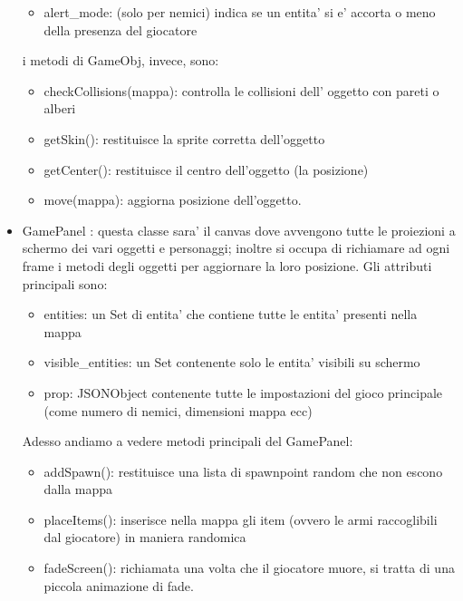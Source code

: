 \documentclass[12pt,a4paper]{report}
\begin{document}
\begin{itemize}
\begin{itemize}
\item alert\_mode: (solo per nemici) indica se un entita' si e' accorta o meno della presenza del giocatore
\end{itemize}
i metodi di GameObj, invece, sono:
\begin{itemize}
\item checkCollisions(mappa): controlla le collisioni dell' oggetto con pareti o alberi
\item getSkin(): restituisce la sprite corretta dell'oggetto
\item getCenter(): restituisce il centro dell'oggetto (la posizione)
\item move(mappa): aggiorna posizione dell'oggetto.
\end{itemize}

\item GamePanel : questa classe sara' il canvas dove avvengono tutte le proiezioni a schermo dei vari oggetti e personaggi; inoltre si occupa di richiamare ad ogni frame i metodi degli oggetti per aggiornare la loro posizione. Gli attributi principali sono:
\begin{itemize}
\item entities: un Set di entita' che contiene tutte le entita' presenti nella mappa
\item visible\_entities: un Set contenente solo le entita' visibili su schermo
\item prop: JSONObject contenente tutte le impostazioni del gioco principale (come numero di nemici, dimensioni mappa ecc)
\end{itemize}
Adesso andiamo a vedere metodi principali del GamePanel:
\begin{itemize}
\item addSpawn(): restituisce una lista di spawnpoint random che non escono dalla mappa

\item placeItems(): inserisce nella mappa gli item (ovvero le armi raccoglibili dal giocatore) in maniera randomica

\item fadeScreen(): richiamata una volta che il giocatore muore, si tratta di una piccola animazione di fade.
\end{itemize}


\end{itemize}
\end{document}
